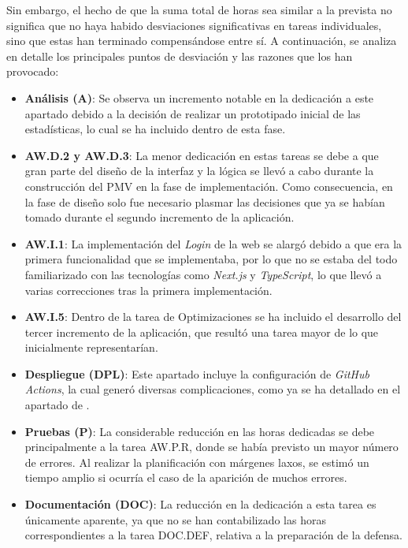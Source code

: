 Sin embargo, el hecho de que la suma total de horas sea similar a la prevista no significa que no haya habido desviaciones significativas en tareas individuales, sino que estas han terminado compensándose entre sí. A continuación, se analiza en detalle los principales puntos de desviación y las razones que los han provocado:

\begin{itemize}
    \item \textbf{Análisis (A)}: Se observa un incremento notable en la dedicación a este apartado debido a la decisión de realizar un prototipado inicial de las estadísticas, lo cual se ha incluido dentro de esta fase.
    \item \textbf{AW.D.2 y AW.D.3}: La menor dedicación en estas tareas se debe a que gran parte del diseño de la interfaz y la lógica se llevó a cabo durante la construcción del PMV en la fase de implementación. Como consecuencia, en la fase de diseño solo fue necesario plasmar las decisiones que ya se habían tomado durante el segundo incremento de la aplicación.
    \item \textbf{AW.I.1}: La implementación del \textit{Login} de la web se alargó debido a que era la primera funcionalidad que se implementaba, por lo que no se estaba del todo familiarizado con las tecnologías como \textit{Next.js} y \textit{TypeScript}, lo que llevó a varias correcciones tras la primera implementación.
    \item \textbf{AW.I.5}: Dentro de la tarea de Optimizaciones se ha incluido el desarrollo del tercer incremento de la aplicación, que resultó una tarea mayor de lo que inicialmente representarían.
    \item \textbf{Despliegue (DPL)}: Este apartado incluye la configuración de \textit{GitHub Actions}, la cual generó diversas complicaciones, como ya se ha detallado en el apartado de .
    \item \textbf{Pruebas (P)}: La considerable reducción en las horas dedicadas se debe principalmente a la tarea AW.P.R, donde se había previsto un mayor número de errores. Al realizar la planificación con márgenes laxos, se estimó un tiempo amplio si ocurría el caso de la aparición de muchos errores.
    \item \textbf{Documentación (DOC)}: La reducción en la dedicación a esta tarea es únicamente aparente, ya que no se han contabilizado las horas correspondientes a la tarea DOC.DEF, relativa a la preparación de la defensa.
\end{itemize}

